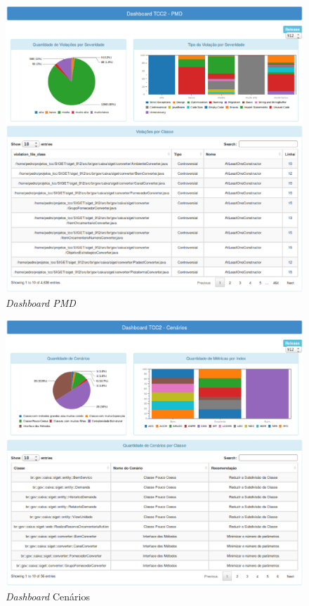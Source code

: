 \begin{figure}[h!]
\centering
\includegraphics[keepaspectratio=false,scale=0.5]{figuras/figuras_nilton/DashboardPMD.eps}
\caption{\textit{Dashboard PMD}}
\label{dashboardPMD}
\end{figure}

\begin{figure}[h!]
\centering
\includegraphics[keepaspectratio=false,scale=0.5]{figuras/figuras_nilton/DashboardCenarios.eps}
\caption{\textit{Dashboard} Cenários}
\label{dashboardFindbugs}
\end{figure}

